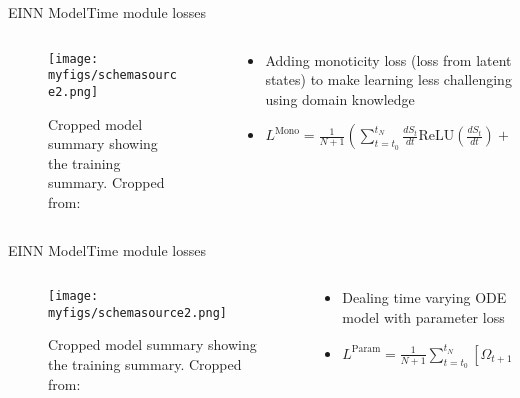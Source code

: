 \documentclass[
	aspectratio=169,	%
	onlytextwidth,		%
	t,					%
	]{beamer}
\begin{document}
\begin{frame}[fragile]{EINN Model}{Time module losses}
	\begin{columns}
		
		\begin{column}[T]{.5\textwidth}
			\begin{figure}
				\texttt{[image: myfigs/schemasource2.png]}
				\caption{Cropped model summary showing the training summary. Cropped from:~\cite{main}}
			\end{figure}
		\end{column}
		
		\begin{column}[T]{.5\textwidth}
			\begin{itemize}
				\item<1-> Adding monoticity loss (loss from latent states) to make learning less challenging using domain knowledge 
				\item<2->	$L^{\text{Mono}} = \frac{1}{N+1} (\sum_{t=t_{0}}^{t_{N}} \frac{dS_{t}}{dt}\text{ReLU} (\frac{dS_{t}}{dt}) + \sum_{t=t_{0}}^{t_{N}} -1\frac{dR_{t}}{dt}\text{ReLU} (-\frac{dR_{t}}{dt}))$
			\end{itemize}
		\end{column}
			
\end{columns}
\end{frame}

\begin{frame}[fragile]{EINN Model}{Time module losses}
	\begin{columns}
		
		\begin{column}[T]{.5\textwidth}
			\begin{figure}
				\texttt{[image: myfigs/schemasource2.png]}
				\caption{Cropped model summary showing the training summary. Cropped from:~\cite{main}}
			\end{figure}
		\end{column}
		
		\begin{column}[T]{.5\textwidth}
			\begin{itemize}
				\item<1-> Dealing time varying ODE model with parameter loss
				\item<2-> $L^{\text{Param}} = \frac{1}{N+1} \sum_{t=t_{0}}^{t_{N}} \left[ \Omega_{t+1} - \Omega_{t} \right]^{2} $
			\end{itemize}
		\end{column}
			
\end{columns}
\end{frame}
\end{document}
